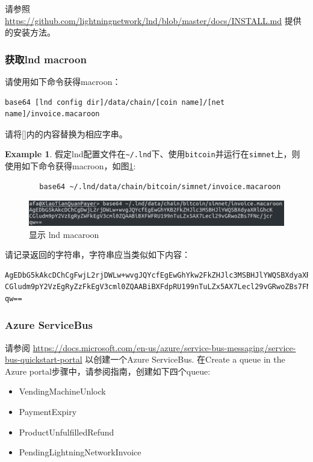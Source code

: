 \documentclass[a4paper,11pt]{article}
\theoremstyle{definition}
\newtheorem{exmp}{Example}[section]
\begin{document}
请参照 \url{https://github.com/lightningnetwork/lnd/blob/master/docs/INSTALL.md} 提供的安装方法。

    \subsubsection{获取lnd macroon}\label{sec:lnd-macroon}

请使用如下命令获得macroon：

\begin{verbatim}
base64 [lnd config dir]/data/chain/[coin name]/[net name]/invoice.macaroon
\end{verbatim}


请将[]内的内容替换为相应字串。

    \begin{exmp}
    假定lnd配置文件在\verb|~/.lnd|下、使用\verb|bitcoin|并运行在\verb|simnet|上，则使用如下命令获得macroon，如图\ref{fig:show-macaroon}:
        \begin{verbatim}
        base64 ~/.lnd/data/chain/bitcoin/simnet/invoice.macaroon
        \end{verbatim}
    \end{exmp}

    \begin{figure}[htbp]
    \minipage[b][][b]{\textwidth}
        \includegraphics[width=\linewidth]{lnd-mac.png}
        \caption{显示 lnd macaroon}
        \label{fig:show-macaroon}
    \endminipage\hfill
    \end{figure}

请记录返回的字符串，字符串应当类似如下内容：
\begin{verbatim}
AgEDbG5kAkcDChCgFwjL2rjDWLw+wvgJQYcfEgEwGhYkw2FkZHJlc3MSBHJlYWQSBXdyaXRlGhcK
CGludm9pY2VzEgRyZzFkEgV3cml0ZQAABiBXFdpRU199nTuLZx5AX7Lecl29vGRwoZBs7FNc/jcr
qw==
\end{verbatim}

    \subsubsection{Azure ServiceBus}
请参阅 \url{https://docs.microsoft.com/en-us/azure/service-bus-messaging/service-bus-quickstart-portal} 以创建一个Azure ServiceBus. 在Create a queue in the Azure portal步骤中，请参阅指南，创建如下四个queue:
\begin{itemize}
  \item VendingMachineUnlock
  \item PaymentExpiry
  \item ProductUnfulfilledRefund
  \item PendingLightningNetworkInvoice
\end{itemize}
    
\end{document}
